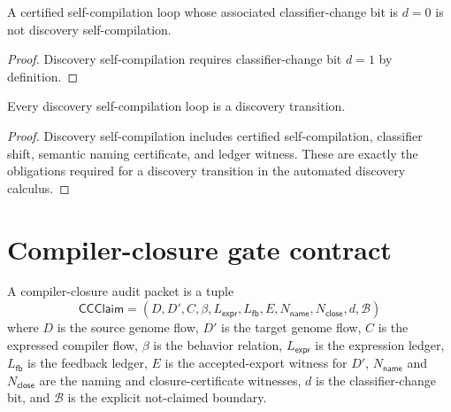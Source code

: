 \begin{theorem}
\label{thm:compiler-closure-self-compilation-not-automatically-discovery}
A certified self-compilation loop whose associated classifier-change bit is
$d=0$ is not discovery self-compilation.
\end{theorem}
\begin{proof}
Discovery self-compilation requires classifier-change bit $d=1$ by definition.
\end{proof}

\begin{theorem}
\label{thm:compiler-closure-discovery-loop-is-discovery}
Every discovery self-compilation loop is a discovery transition.
\end{theorem}
\begin{proof}
Discovery self-compilation includes certified self-compilation, classifier
shift, semantic naming certificate, and ledger witness. These are exactly the
obligations required for a discovery transition in the automated discovery
calculus.
\end{proof}

\section{Compiler-closure gate contract}
\label{sec:compiler-closure-gate-contract}

\begin{definition}
\label{def:compiler-closure-audit-packet}
A compiler-closure audit packet is a tuple
$$
\mathsf{CCClaim}=
(D,D',C,\beta,L_{\mathsf{expr}},L_{\mathsf{fb}},E,N_{\mathsf{name}},
N_{\mathsf{close}},d,\mathcal B)
$$
where $D$ is the source genome flow, $D'$ is the target genome flow, $C$ is
the expressed compiler flow, $\beta$ is the behavior relation,
$L_{\mathsf{expr}}$ is the expression ledger, $L_{\mathsf{fb}}$ is the feedback
ledger, $E$ is the accepted-export witness for $D'$, $N_{\mathsf{name}}$ and
$N_{\mathsf{close}}$ are the naming and closure-certificate witnesses, $d$ is
the classifier-change bit, and $\mathcal B$ is the explicit not-claimed
boundary.
\end{definition}

